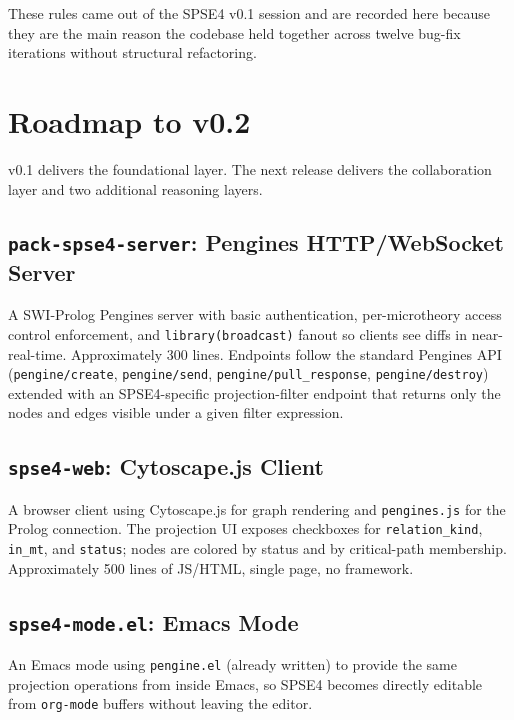 \documentclass[11pt,letterpaper]{article}
\begin{document}
These rules came out of the SPSE4 v0.1 session and are recorded here
because they are the main reason the codebase held together across twelve
bug-fix iterations without structural refactoring.

\section{Roadmap to v0.2}
\label{sec:roadmap}

v0.1 delivers the foundational layer. The next release delivers the
collaboration layer and two additional reasoning layers.

\subsection{\texttt{pack-spse4-server}: Pengines HTTP/WebSocket Server}

A SWI-Prolog Pengines server with basic authentication, per-microtheory
access control enforcement, and \texttt{library(broadcast)} fanout so
clients see diffs in near-real-time. Approximately 300 lines. Endpoints
follow the standard Pengines API \citep{lager-pengines-2014}
(\texttt{pengine/create},
\texttt{pengine/send}, \texttt{pengine/pull\_response},
\texttt{pengine/destroy}) extended with an SPSE4-specific
projection-filter endpoint that returns only the nodes and edges visible
under a given filter expression.

\subsection{\texttt{spse4-web}: Cytoscape.js Client}

A browser client using Cytoscape.js for graph rendering and
\texttt{pengines.js} for the Prolog connection. The projection UI exposes
checkboxes for \texttt{relation\_kind}, \texttt{in\_mt}, and
\texttt{status}; nodes are colored by status and by critical-path
membership. Approximately 500 lines of JS/HTML, single page, no framework.

\subsection{\texttt{spse4-mode.el}: Emacs Mode}

An Emacs mode using \texttt{pengine.el} (already written) to provide the
same projection operations from inside Emacs, so SPSE4 becomes directly
editable from \texttt{org-mode} buffers without leaving the editor.
\end{document}
